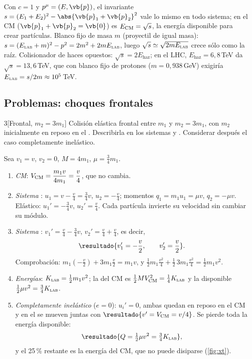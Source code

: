 \begin{observacion}
Con $c=1$ y $p^{\mu}=(E,\vb{p})$, el invariante $s=(E_{1}+E_{2})^{2}-\abs{\vb{p}_{1}+\vb{p}_{2}}^{2}$
vale lo mismo en todo sistema; en el CM ($\vb{p}_{1}+\vb{p}_{2}=\vb{0}$) es $E_{\mathrm{CM}}=\sqrt{s}$,
la energía disponible para crear partículas. Blanco fijo de masa $m$ (proyectil de igual masa):
$s=(E_{\textup{\textsc{lab}}}+m)^{2}-p^{2}=2m^{2}+2mE_{\textup{\textsc{lab}}}$, luego $\sqrt s\simeq\sqrt{2mE_{\textup{\textsc{lab}}}}$ crece sólo como la raíz.
Colisionador de haces opuestos: $\sqrt s=2E_{\text{haz}}$; en el LHC,
$E_{\text{haz}}=6{,}8$\,TeV da $\sqrt s=13{,}6$\,TeV, que con blanco fijo de protones
($m=0{,}938$\,GeV) exigiría $E_{\textup{\textsc{lab}}}=s/2m\approx10^{5}$\,TeV.
\end{observacion}

\subsection{Problemas: choques frontales}

\begin{problema}{3}[Frontal, $m_{2}=3m_{1}$]
\label{prob:3}
Colisión elástica frontal entre $m_{1}$ y $m_{2}=3m_{1}$, con $m_{2}$ inicialmente en reposo
en el \lab. Describirla en los sistemas \lab{} y \scm. Considerar después el caso
completamente inelástico.
\end{problema}

\begin{resolucion}
Sea $v_{1}=v$, $v_{2}=0$, $M=4m_{1}$, $\mu=\tfrac34m_{1}$.
\begin{enumerate}
  \item \emph{CM}: $V_{\mathrm{CM}}=\dfrac{m_{1}v}{4m_{1}}=\dfrac v4$, que no cambia.
  \item \emph{Sistema \scm}: $u_{1}=v-\frac v4=\frac34v$, $u_{2}=-\frac v4$; momentos
        $q_{1}=m_{1}u_{1}=\mu v$, $q_{2}=-\mu v$. Elástico: $u_{1}'=-\frac34v$, $u_{2}'=\frac v4$.
        Cada partícula invierte su velocidad sin cambiar su módulo.
  \item \emph{Sistema \lab}: $v_{1}'=\frac v4-\frac34v$, $v_{2}'=\frac v4+\frac v4$, es decir,
        \[
          \resultado{v_{1}'=-\frac v2,\qquad v_{2}'=\frac v2} .
        \]
        Comprobación: $m_{1}(-\frac v2)+3m_{1}\frac v2=m_{1}v$, y
        $\frac12m_{1}\frac{v^{2}}4+\frac12\,3m_{1}\frac{v^{2}}4=\frac12m_{1}v^{2}$.
  \item \emph{Energías}: $K_{\textup{\textsc{lab}}}=\frac12m_{1}v^{2}$; la del CM es $\frac12MV_{\mathrm{CM}}^{2}=\frac14K_{\textup{\textsc{lab}}}$
        y la disponible $\frac12\mu v^{2}=\frac34K_{\textup{\textsc{lab}}}$.
  \item \emph{Completamente inelástico} ($e=0$): $u_{i}'=0$, ambas quedan en reposo en el CM y en
        el \lab{} se mueven juntas con $\resultado{v'=V\cm=v/4}$. Se pierde toda la energía disponible:
        \[
          \resultado{Q=\tfrac12\mu v^{2}=\tfrac34K_{\lab}} ,
        \]
        y el 25\,\% restante es la energía del CM, que no puede disiparse (\cref{fig:xt}).\qedhere
\end{enumerate}
\end{resolucion}

